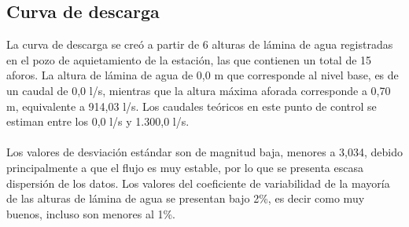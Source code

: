\documentclass[]{article}
\begin{document}
\subsection{Curva de descarga}\label{curva-de-descarga-6}

La curva de descarga se creó a partir de 6 alturas de lámina de agua registradas en el pozo de aquietamiento de la estación, las que contienen un total de 15 aforos. La altura de lámina de agua de 0,0 m que corresponde al  nivel base, es de un caudal de 0,0 l/s, mientras que la altura máxima aforada corresponde a 0,70 m, equivalente a 914,03 l/s. Los caudales teóricos en este punto de control se estiman entre los 0,0 l/s y 1.300,0 l/s.\\
\\
Los valores de desviación estándar son de magnitud baja, menores a 3,034,  debido principalmente a que el flujo es muy estable, por lo que se presenta escasa dispersión de los datos. Los valores del coeficiente de variabilidad de la mayoría de las alturas de lámina de agua se presentan bajo 2\%, es decir como muy buenos, incluso son menores al 1\%. 
\end{document}
